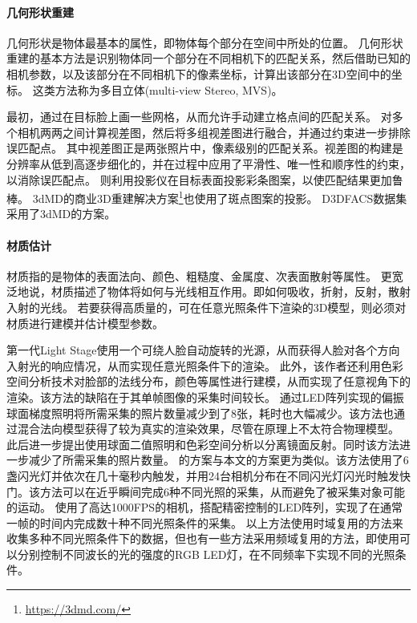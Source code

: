 \paragraph{几何形状重建}
几何形状是物体最基本的属性，即物体每个部分在空间中所处的位置。
几何形状重建的基本方法是识别物体同一个部分在不同相机下的匹配关系，然后借助已知的相机参数，以及该部分在不同相机下的像素坐标，计算出该部分在3D空间中的坐标。
这类方法称为多目立体(multi-view Stereo, MVS)。

最初，\citet{PFM}通过在目标脸上画一些网格，从而允许手动建立格点间的匹配关系。
\citet{ss_geo}对多个相机两两之间计算视差图，然后将多组视差图进行融合，并通过约束进一步排除误匹配点。
其中视差图正是两张照片中，像素级别的匹配关系。视差图的构建是分辨率从低到高逐步细化的，并在过程中应用了平滑性、唯一性和顺序性的约束，以消除误匹配点。
\citet{DEP}则利用投影仪在目标表面投影彩条图案，以使匹配结果更加鲁棒。
3dMD的商业3D重建解决方案\footnote{\url{https://3dmd.com/}}也使用了斑点图案的投影。
D3DFACS\citep{D3DFACS}数据集采用了3dMD的方案。

\paragraph{材质估计}
材质指的是物体的表面法向、颜色、粗糙度、金属度、次表面散射等属性。
更宽泛地说，材质描述了物体将如何与光线相互作用。即如何吸收，折射，反射，散射入射的光线。
若要获得高质量的，可在任意光照条件下渲染的3D模型，则必须对材质进行建模并估计模型参数。

第一代Light Stage\citep{light_stage}使用一个可绕人脸自动旋转的光源，从而获得人脸对各个方向入射光的响应情况，从而实现任意光照条件下的渲染。
此外，该作者还利用色彩空间分析技术\cite{temporal_color}对脸部的法线分布，颜色等属性进行建模，从而实现了任意视角下的渲染。该方法的缺陷在于其单帧图像的采集时间较长。
\citet{MaHPCWD07}通过LED阵列实现的偏振球面梯度照明将所需采集的照片数量减少到了8张，耗时也大幅减少。该方法也通过混合法向模型获得了较为真实的渲染效果，尽管在原理上不太符合物理模型。
此后\citet{KampourisZG18}进一步提出使用球面二值照明和色彩空间分析\cite{MallickZKB05}以分离镜面反射。同时该方法进一步减少了所需采集的照片数量。
\citet{FyffeGTGD16}的方案与本文的方案更为类似。该方法使用了6盏闪光灯并依次在几十毫秒内触发，并用24台相机分布在不同闪光灯闪光时触发快门。该方法可以在近乎瞬间完成6种不同光照的采集，从而避免了被采集对象可能的运动。
\citet{ZhangZZLCYXY22}使用了高达1000FPS的相机，搭配精密控制的LED阵列，实现了在通常一帧的时间内完成数十种不同光照条件的采集。
以上方法使用时域复用的方法来收集多种不同光照条件下的数据，但也有一些方法\citep{FyffeD15,MekaHPZFFKYBDDB19}采用频域复用的方法，即使用可以分别控制不同波长的光的强度的RGB LED灯，在不同频率下实现不同的光照条件。

